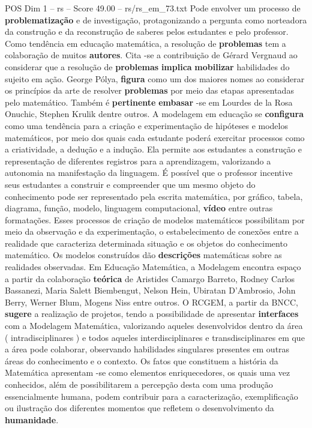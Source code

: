 \begin{textsample}{POS Dim 1 – rs – Score 49.00 – rs/rs\_em\_73.txt}
Pode envolver um processo de \textbf{problematização} e de investigação, protagonizando a pergunta como norteadora da construção e da reconstrução de saberes pelos estudantes e pelo professor.
Como tendência em educação matemática, a resolução de \textbf{problemas} tem a colaboração de muitos \textbf{autores}.
Cita -se a contribuição de Gérard Vergnaud ao considerar que a resolução de \textbf{problemas} \textbf{implica} \textbf{mobilizar} habilidades do sujeito em ação.
George Pólya, \textbf{figura} como um dos maiores nomes ao considerar os princípios da arte de resolver \textbf{problemas} por meio das etapas apresentadas pelo matemático.
Também é \textbf{pertinente} \textbf{embasar} -se em Lourdes de la Rosa Onuchic, Stephen Krulik dentre outros.
A modelagem em educação se \textbf{configura} como uma tendência para a criação e experimentação de hipóteses e modelos matemáticos, por meio dos quais cada estudante poderá exercitar processos como a criatividade, a dedução e a indução.
Ela permite aos estudantes a construção e representação de diferentes registros para a aprendizagem, valorizando a autonomia na manifestação da linguagem.
É possível que o professor incentive seus estudantes a construir e compreender que um mesmo objeto do conhecimento pode ser representado pela escrita matemática, por gráfico, tabela, diagrama, função, modelo, linguagem computacional, \textbf{vídeo} entre outras formatações.
Esses processos de criação de modelos matemáticos possibilitam por meio da observação e da experimentação, o estabelecimento de conexões entre a realidade que caracteriza determinada situação e os objetos do conhecimento matemático.
Os modelos construídos dão \textbf{descrições} matemáticas sobre as realidades observadas.
Em Educação Matemática, a Modelagem encontra espaço a partir da colaboração \textbf{teórica} de Aristides Camargo Barreto, Rodney Carlos Bassanezi, Maria Salett Biembengut, Nelson Hein, Ubiratan D’Ambrosio, John Berry, Werner Blum, Mogens Niss entre outros.
O RCGEM, a partir da BNCC, \textbf{sugere} a realização de projetos, tendo a possibilidade de apresentar \textbf{interfaces} com a Modelagem Matemática, valorizando aqueles desenvolvidos dentro da área ( intradisciplinares ) e todos aqueles interdisciplinares e transdisciplinares em que a área pode colaborar, observando habilidades singulares presentes em outras áreas do conhecimento e o contexto.
Os fatos que constituem a história da Matemática apresentam -se como elementos enriquecedores, os quais uma vez conhecidos, além de possibilitarem a percepção desta com uma produção essencialmente humana, podem contribuir para a caracterização, exemplificação ou ilustração dos diferentes momentos que refletem o desenvolvimento da \textbf{humanidade}.

\end{textsample}
